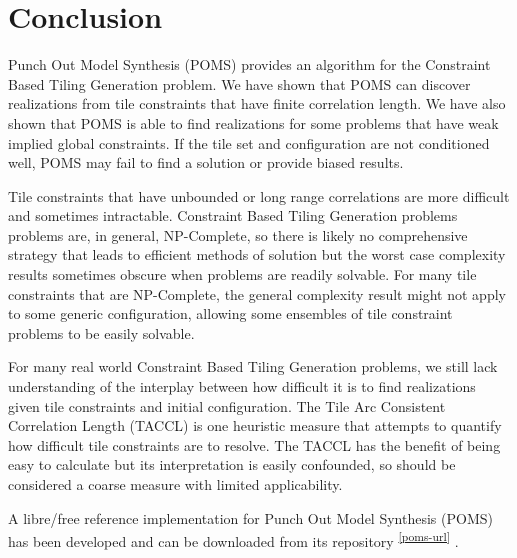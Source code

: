 \section{Conclusion}

Punch Out Model Synthesis (POMS) provides an algorithm for the Constraint Based Tiling Generation problem.
We have shown that POMS can discover realizations from tile constraints that have finite correlation length.
We have also shown that POMS is able to find realizations for some problems
that have weak implied global constraints.
If the tile set and configuration are not conditioned well,
POMS may fail to find a solution or provide biased results.

Tile constraints that have unbounded or long range correlations are more difficult and sometimes intractable.
Constraint Based Tiling Generation problems problems are, in general, NP-Complete, so there is likely
no comprehensive strategy that leads to efficient methods of solution but the worst case complexity
results sometimes obscure when problems are readily solvable.
For many tile constraints that are NP-Complete, the general complexity result might not
apply to some generic configuration, allowing some ensembles of tile constraint problems
to be easily solvable.

For many real world Constraint Based Tiling Generation problems, we still lack understanding of the
interplay between how difficult it is to find realizations given tile constraints
and initial configuration.
The Tile Arc Consistent Correlation Length (TACCL) is one heuristic measure that attempts
to quantify how difficult tile constraints are to resolve.
The TACCL has the benefit of being easy to calculate but its interpretation is easily confounded,
so should be considered a coarse measure with limited applicability.

A libre/free reference implementation for Punch Out Model Synthesis (POMS) has been developed and can be downloaded
from its repository \textsuperscript{ \ref{poms-url} }.

